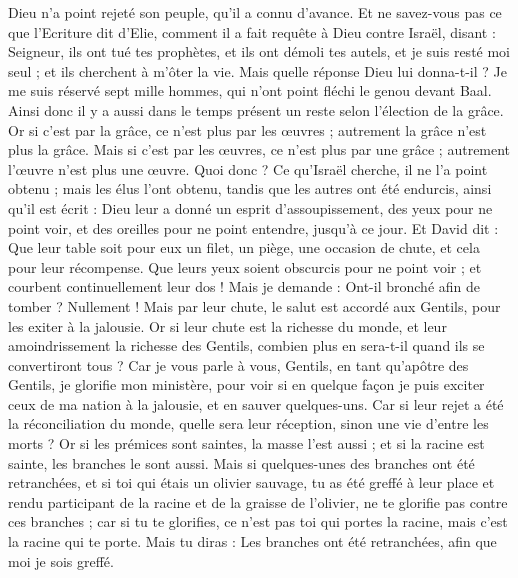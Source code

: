 \begin{multicols}{2}
Dieu n'a point rejeté son peuple, qu'il a connu d'avance. Et ne savez-vous pas ce que l'Ecriture dit d'Elie, comment il a fait requête à Dieu contre Israël, disant :
Seigneur, ils ont tué tes prophètes, et ils ont démoli tes autels, et je suis resté moi seul ; et ils cherchent à m'ôter la vie.
Mais quelle réponse Dieu lui donna-t-il ? Je me suis réservé sept mille hommes, qui n'ont point fléchi le genou devant Baal.
Ainsi donc il y a aussi dans le temps présent un reste selon l'élection de la grâce.
Or si c'est par la grâce, ce n'est plus par les œuvres ; autrement la grâce n'est plus la grâce. Mais si c'est par les œuvres, ce n'est plus par une grâce ; autrement l'œuvre n'est plus une œuvre.
Quoi donc ? Ce qu'Israël cherche, il ne l'a point obtenu ; mais les élus l'ont obtenu, tandis que les autres ont été endurcis,
ainsi qu'il est écrit : Dieu leur a donné un esprit d'assoupissement, des yeux pour ne point voir, et des oreilles pour ne point entendre, jusqu'à ce jour. Et David dit :
Que leur table soit pour eux un filet, un piège, une occasion de chute, et cela pour leur récompense.
Que leurs yeux soient obscurcis pour ne point voir ; et courbent continuellement leur dos !
Mais je demande : Ont-il bronché afin de tomber ? Nullement ! Mais par leur chute, le salut est accordé aux Gentils, pour les exiter à la jalousie.
Or si leur chute est la richesse du monde, et leur amoindrissement la richesse des Gentils, combien plus en sera-t-il quand ils se convertiront tous ?
Car je vous parle à vous, Gentils, en tant qu'apôtre des Gentils, je glorifie mon ministère,
pour voir si en quelque façon je puis exciter ceux de ma nation à la jalousie, et en sauver quelques-uns.
Car si leur rejet a été la réconciliation du monde, quelle sera leur réception, sinon une vie d'entre les morts ?
Or si les prémices sont saintes, la masse l'est aussi ; et si la racine est sainte, les branches le sont aussi.
Mais si quelques-unes des branches ont été retranchées, et si toi qui étais un olivier sauvage, tu as été greffé à leur place et rendu participant de la racine et de la graisse de l'olivier,
ne te glorifie pas contre ces branches ; car si tu te glorifies, ce n'est pas toi qui portes la racine, mais c'est la racine qui te porte.
Mais tu diras : Les branches ont été retranchées, afin que moi je sois greffé.

\end{multicols}

